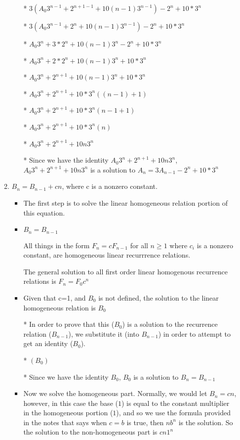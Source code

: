 \documentclass{article}
\begin{document}
\begin{enumerate}
\begin{enumerate}
\begin{itemize}
    \item [*] $3(A_{0}3^{n-1}+2^{n+1-1}+10(n-1)3^{n-1})-2^{n}+10*3^{n}$
    \item [*] $3(A_{0}3^{n-1}+2^{n}+10(n-1)3^{n-1})-2^{n}+10*3^{n}$
    \item [*] $A_{0}3^{n}+3*2^{n}+10(n-1)3^{n}-2^{n}+10*3^{n}$
    \item [*] $A_{0}3^{n}+2*2^{n}+10(n-1)3^{n}+10*3^{n}$
    \item [*] $A_{0}3^{n}+2^{n+1}+10(n-1)3^{n}+10*3^{n}$
    \item [*] $A_{0}3^{n}+2^{n+1}+10*3^{n}((n-1)+1)$
    \item [*] $A_{0}3^{n}+2^{n+1}+10*3^{n}(n-1+1)$
    \item [*] $A_{0}3^{n}+2^{n+1}+10*3^{n}(n)$
    \item [*] $A_{0}3^{n}+2^{n+1}+10n3^{n}$
    \item [*] Since we have the identity $A_{0}3^{n}+2^{n+1}+10n3^{n}$, $A_{0}3^{n}+2^{n+1}+10n3^{n}$ is a solution to $A_{n}=3A_{n-1}-2^{n}+10*3^{n}$
    \end{itemize} %
  \item $B_{n}=B_{n-1}+cn$, where c is a nonzero constant.
    \begin{itemize}
    \item The first step is to solve the linear homogeneous relation portion of this equation.
    \item $B_{n}=B_{n-1}$
    \item [] All things in the form $F_{n}=cF_{n-1}$ for all $n\geq1$ where $c_{i}$ is a nonzero constant, are homogeneous linear recurrrence relations.
    \item [] The general solution to all first order linear homogenous recurrence relations is $F_{n}=F_{0}c^{n}$
    \item Given that c=1, and $B_{0}$ is not defined, the solution to the linear homogeneous relation is $B_{0}$
    \item [*] In order to prove that this ($B_{0}$) is a solution to the recurrence relation ($B_{n-1}$), we substitute it (into $B_{n-1}$) in order to attempt to get an identity ($B_{0}$).
    \item [*] $(B_{0})$
    \item [*] Since we have the identity $B_{0}$, $B_{0}$ is a solution to $B_{n}=B_{n-1}$
    \item Now we solve the homogeneous part. Normally, we would let $B_{n}=cn$, however, in this case the base ($1$) is equal to the constant multiplier in the homogeneous portion ($1$), and so we use the formula provided in the notes that says when $c=b$ is true, then $nb^{n}$ is the solution. So the solution to the non-homogeneous part is $cn1^{n}$

\end{itemize}
\end{enumerate}
\end{enumerate}
\end{document}
